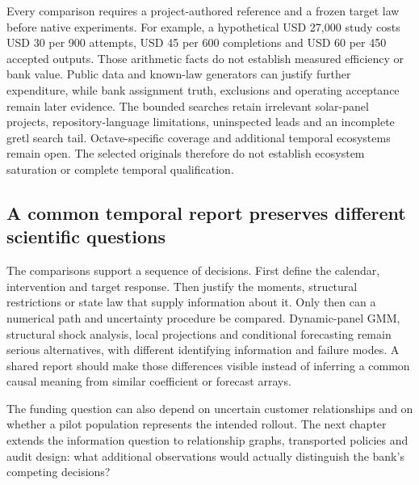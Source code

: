 Every comparison requires a project-authored reference and a frozen target law before native experiments. For example, a hypothetical USD 27,000 study costs USD 30 per 900 attempts, USD 45 per 600 completions and USD 60 per 450 accepted outputs. Those arithmetic facts do not establish measured efficiency or bank value. Public data and known-law generators can justify further expenditure, while bank assignment truth, exclusions and operating acceptance remain later evidence. The bounded searches retain irrelevant solar-panel projects, repository-language limitations, uninspected leads and an incomplete gretl search tail. Octave-specific coverage and additional temporal ecosystems remain open. The selected originals therefore do not establish ecosystem saturation or complete temporal qualification.~\citep{exec25_odyn_choice}


\subsection{A common temporal report preserves different scientific questions}

The comparisons support a sequence of decisions. First define the calendar,
intervention and target response. Then justify the moments, structural
restrictions or state law that supply information about it. Only then can a
numerical path and uncertainty procedure be compared. Dynamic-panel GMM,
structural shock analysis, local projections and conditional forecasting remain
serious alternatives, with different identifying information and failure modes.
A shared report should make those differences visible instead of inferring a
common causal meaning from similar coefficient or forecast arrays.

The funding question can also depend on uncertain customer relationships and
on whether a pilot population represents the intended rollout. The next chapter
extends the information question to relationship graphs, transported policies
and audit design: what additional observations would actually distinguish the
bank's competing decisions?
